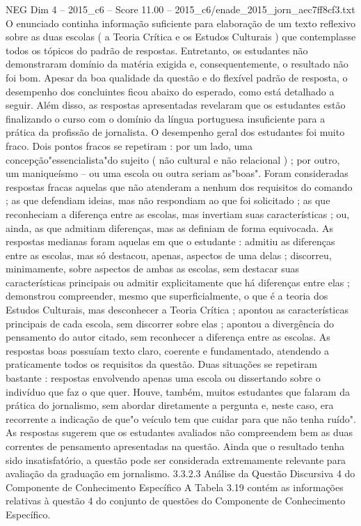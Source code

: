 \begin{textsample}{NEG Dim 4 – 2015\_c6 – Score 11.00 – 2015\_c6/enade\_2015\_jorn\_aec7ff8cf3.txt}
O enunciado continha informação suficiente para elaboração de um texto reflexivo sobre as duas escolas ( a Teoria Crítica e os Estudos Culturais ) que contemplasse todos os tópicos do padrão de respostas.
Entretanto, os estudantes não demonstraram domínio da matéria exigida e, consequentemente, o resultado não foi bom.
Apesar da boa qualidade da questão e do flexível padrão de resposta, o desempenho dos concluintes ficou abaixo do esperado, como está detalhado a seguir.
Além disso, as respostas apresentadas revelaram que os estudantes estão finalizando o curso com o domínio da língua portuguesa insuficiente para a prática da profissão de jornalista.
O desempenho geral dos estudantes foi muito fraco.
Dois pontos fracos se repetiram : por um lado, uma concepção"essencialista"do sujeito ( não cultural e não relacional ) ; por outro, um maniqueísmo – ou uma escola ou outra seriam as"boas".
Foram consideradas respostas fracas aquelas que não atenderam a nenhum dos requisitos do comando ; as que defendiam ideias, mas não respondiam ao que foi solicitado ; as que reconheciam a diferença entre as escolas, mas invertiam suas características ; ou, ainda, as que admitiam diferenças, mas as definiam de forma equivocada.
As respostas medianas foram aquelas em que o estudante : admitiu as diferenças entre as escolas, mas só destacou, apenas, aspectos de uma delas ; discorreu, minimamente, sobre aspectos de ambas as escolas, sem destacar suas características principais ou admitir explicitamente que há diferenças entre elas ; demonstrou compreender, mesmo que superficialmente, o que é a teoria dos Estudos Culturais, mas desconhecer a Teoria Crítica ; apontou as características principais de cada escola, sem discorrer sobre elas ; apontou a divergência do pensamento do autor citado, sem reconhecer a diferença entre as escolas.
As respostas boas possuíam texto claro, coerente e fundamentado, atendendo a praticamente todos os requisitos da questão.
Duas situações se repetiram bastante : respostas envolvendo apenas uma escola ou dissertando sobre o indivíduo que faz o que quer.
Houve, também, muitos estudantes que falaram da prática do jornalismo, sem abordar diretamente a pergunta e, neste caso, era recorrente a indicação de que"o veículo tem que cuidar para que não tenha ruído".
As respostas sugerem que os estudantes avaliados não compreendem bem as duas correntes de pensamento apresentadas na questão.
Ainda que o resultado tenha sido insatisfatório, a questão pode ser considerada extremamente relevante para avaliação da graduação em jornalismo. 3.3.2.3 Análise da Questão Discursiva 4 do Componente de Conhecimento Específico A Tabela 3.19 contém as informações relativas à questão 4 do conjunto de questões do Componente de Conhecimento Específico.

\end{textsample}
